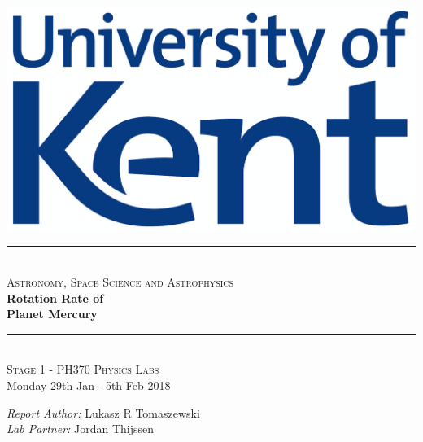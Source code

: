 \documentclass[11pt]{article}
\begin{document}
\begin{titlepage}

\newcommand{\HRule}{\rule{\linewidth}{0.5mm}}

\begin{centering} 
 

\includegraphics[scale=0.4]{Uni_of_Kent_Logo.png}\\[1cm]


\HRule \\[0.4cm]
\textsc{\large Astronomy, Space Science and Astrophysics}\\[0.4cm]
{\Huge \bfseries Rotation Rate of \\ [0.5cm] Planet Mercury}\\[0.4cm]
\HRule \\[1.0cm]


\textsc{\Large Stage 1 - PH370 Physics Labs}\\[0.5cm] 
{\large Monday 29th Jan - 5th Feb 2018}\\[1.0cm]


\begin{minipage}{0.625\textwidth}
\centering

\emph{\large Report Author:} \large Lukasz R Tomaszewski \\ [0.2cm]
\emph{\large Lab Partner:} \large Jordan Thijssen \\

\end{minipage}\\[2cm]

\vfill
\end{centering} 
\end{titlepage}
\end{document}
